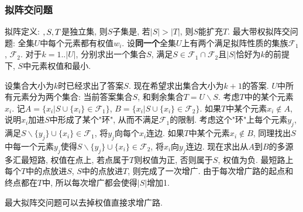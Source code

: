 \subsubsection{拟阵交问题}
拟阵定义: $\empty,S,T$是独立集, 则$S$子集是, 若$|S|>|T|$, 则$S$能扩充$T$.
最大带权拟阵交问题: 全集$U$中每个元素都有权值$w_i$. 设\textbf{同一个}全集$U$上有两个满足拟阵性质的集族$\mathcal{F}_1$, $\mathcal{F}_2$. 对于$k=1..|U|$, 分别求出一个集合$S$, 满足$S\in \mathcal{F}_1 \cap\mathcal{F}_2$且$|S|$恰好为$k$的前提下, $S$中元素权值和最小.

设集合大小为$k$时已经求出了答案$S$. 现在希望求出集合大小为$k+1$的答案. 
$U$中所有元素分为两个集合: 当前答案集合$S$, 和剩余集合$T=U\backslash S$. 考虑$T$中的某个元素$x_i$. 记$A=\{x_i|S\cup \{x_i\}\in\mathcal{F}_1\}$, $B=\{x_i|S\cup \{x_i\}\in\mathcal{F}_2\}$.
如果$T$中某个元素$x_i\notin A$, 说明$x_i$加进$S$中形成了某个"环", 从而不满足$\mathcal{F}_1$的限制. 考虑这个"环"上每个元素$y_j$, 满足$S\backslash\{y_j\}\cup \{x_i\}\in\mathcal{F}_1$, 将$y_j$向每个$x_i$连边.
如果$T$中某个元素$x_i\notin B$, 同理找出$S$中每一个元素$y_j$使得$S\backslash\{y_j\}\cup \{x_i\}\in\mathcal{F}_2$, 将$x_i$向$y_j$连边.
现在求出从$A$到$B$的多源多汇最短路, 权值在点上, 若点属于$T$则权值为正, 否则属于$S$, 权值为负. 最短路上每个$T$中的点放进$S$, $S$中的点放进$T$, 则完成了一次增广.
由于每次增广路的起点和终点都在$T$中, 所以每次增广都会使得$|S|$增加1.

最大拟阵交问题可以去掉权值直接求增广路.